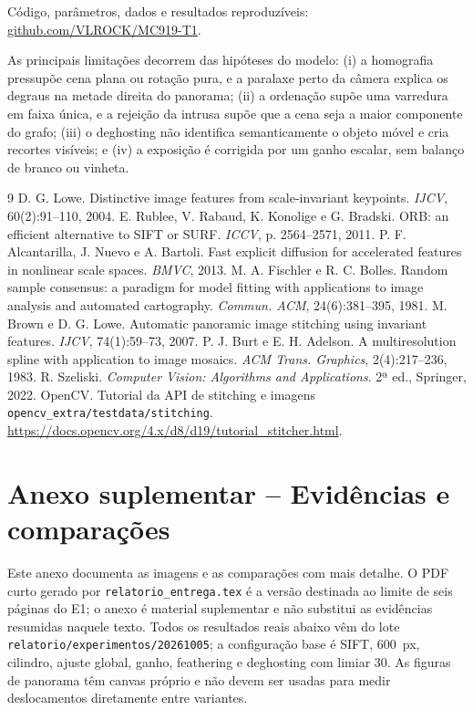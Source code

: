 \documentclass[10pt,a4paper]{article}
\begin{document}
Código, parâmetros, dados e resultados reproduzíveis:
\href{https://github.com/VLROCK/MC919-T1}{github.com/VLROCK/MC919-T1}.

As principais limitações decorrem das hipóteses do modelo: (i) a homografia pressupõe cena plana ou
rotação pura, e a paralaxe perto da câmera explica os degraus na metade direita do panorama; (ii) a
ordenação supõe uma varredura em faixa única, e a rejeição da intrusa supõe que a cena seja a maior
componente do grafo; (iii) o deghosting não identifica semanticamente o objeto móvel e cria recortes
visíveis; e (iv) a exposição é corrigida por um ganho escalar, sem balanço de branco ou vinheta.

\begin{thebibliography}{9}
\footnotesize
\setlength{\itemsep}{0pt}
 D. G. Lowe. Distinctive image features from scale-invariant keypoints. \textit{IJCV},
60(2):91--110, 2004.
 E. Rublee, V. Rabaud, K. Konolige e G. Bradski. ORB: an efficient alternative to SIFT
or SURF. \textit{ICCV}, p. 2564--2571, 2011.
 P. F. Alcantarilla, J. Nuevo e A. Bartoli. Fast explicit diffusion for
accelerated features in nonlinear scale spaces. \textit{BMVC}, 2013.
 M. A. Fischler e R. C. Bolles. Random sample consensus: a paradigm for model
fitting with applications to image analysis and automated cartography. \textit{Commun. ACM},
24(6):381--395, 1981.
 M. Brown e D. G. Lowe. Automatic panoramic image stitching using invariant features.
\textit{IJCV}, 74(1):59--73, 2007.
 P. J. Burt e E. H. Adelson. A multiresolution spline with application to image
mosaics. \textit{ACM Trans. Graphics}, 2(4):217--236, 1983.
 R. Szeliski. \textit{Computer Vision: Algorithms and Applications}. 2ª ed.,
Springer, 2022.
 OpenCV. Tutorial da API de stitching e imagens \texttt{opencv\_extra/testdata/stitching}.
\url{https://docs.opencv.org/4.x/d8/d19/tutorial_stitcher.html}.
\end{thebibliography}

\ifdefined\versaoentrega
\else
\clearpage
\setcounter{page}{1}
\renewcommand{\thepage}{A\arabic{page}}
\section*{Anexo suplementar -- Evidências e comparações}
Este anexo documenta as imagens e as comparações com mais detalhe. O PDF curto gerado por
\texttt{relatorio\_entrega.tex} é a versão destinada ao limite de seis páginas do E1; o anexo é material
suplementar e não substitui as evidências resumidas naquele texto. Todos os resultados reais abaixo vêm
do lote \texttt{relatorio/experimentos/20261005}; a configuração base é SIFT, 600~px, cilindro, ajuste
global, ganho, feathering e deghosting com limiar 30. As figuras de panorama têm canvas próprio e não
devem ser usadas para medir deslocamentos diretamente entre variantes.
\end{document}
